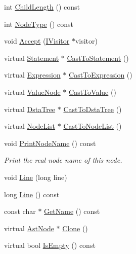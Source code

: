 \begin{DoxyCompactItemize}
\item 
int \hyperlink{classmocha_1_1_ast_node_a6ecb0925a6380a375a92451256039d7f}{ChildLength} () const 
\item 
int \hyperlink{classmocha_1_1_ast_node_a930b6f930cbe0efddfde28ec73c200bc}{NodeType} () const 
\item 
void \hyperlink{classmocha_1_1_ast_node_a4d8947fa366bc716d745a12c55968458}{Accept} (\hyperlink{classmocha_1_1_i_visitor}{IVisitor} $\ast$visitor)
\item 
virtual \hyperlink{classmocha_1_1_statement}{Statement} $\ast$ \hyperlink{classmocha_1_1_ast_node_a1fe8a6f31b9f47be0867f18c89f6349e}{CastToStatement} ()
\item 
virtual \hyperlink{classmocha_1_1_expression}{Expression} $\ast$ \hyperlink{classmocha_1_1_ast_node_aece953ac3a588a8d731d258e4e7e57d9}{CastToExpression} ()
\item 
virtual \hyperlink{classmocha_1_1_value_node}{ValueNode} $\ast$ \hyperlink{classmocha_1_1_ast_node_a21324d298123937056c972179d03fade}{CastToValue} ()
\item 
virtual \hyperlink{classmocha_1_1_dsta_tree}{DstaTree} $\ast$ \hyperlink{classmocha_1_1_ast_node_a29ea81ee14ae435fc24dcbf25a617580}{CastToDstaTree} ()
\item 
virtual \hyperlink{classmocha_1_1_node_list}{NodeList} $\ast$ \hyperlink{classmocha_1_1_ast_node_ad9408c65e5b3f9620bc057396a850f07}{CastToNodeList} ()
\item 
void \hyperlink{classmocha_1_1_ast_node_a0d500c7d49e700560a7765f5e95c4c52}{PrintNodeName} () const 
\begin{DoxyCompactList}\small\item\em Print the real node name of this node. \end{DoxyCompactList}\item 
void \hyperlink{classmocha_1_1_ast_node_a6bda7ec5e55d6baa2afc4ab4300caaf1}{Line} (long line)
\item 
long \hyperlink{classmocha_1_1_ast_node_ac0488f29fbf5f19237385dd08a4ab81d}{Line} () const 
\item 
const char $\ast$ \hyperlink{classmocha_1_1_ast_node_a9ba8e34d2b96cfe1caa097ae620fca6e}{GetName} () const 
\item 
virtual \hyperlink{classmocha_1_1_ast_node}{AstNode} $\ast$ \hyperlink{classmocha_1_1_ast_node_af2a895699bac2012f8b7739bff49c5ec}{Clone} ()
\item 
virtual bool \hyperlink{classmocha_1_1_ast_node_a31dd8fcdbeb4b1a6aae660a64a1aac99}{IsEmpty} () const 
\end{DoxyCompactItemize}
